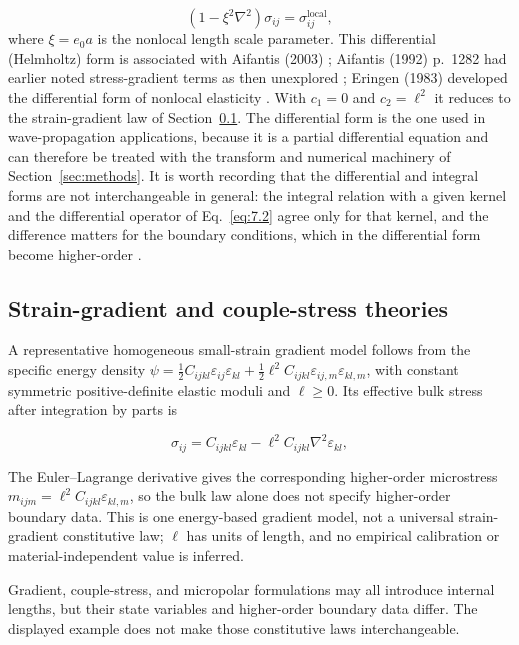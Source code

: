 \begin{equation}
(1 - \xi^2\nabla^2)\sigma_{ij} = \sigma_{ij}^{\mathrm{local}},
\label{eq:7.2}
\end{equation}
where $\xi = e_0 a$ is the nonlocal length scale parameter. This differential (Helmholtz) form is associated with Aifantis (2003) \cite{Aifantis2003}; Aifantis (1992) p.~1282 had earlier noted stress-gradient terms as then unexplored \cite{Aifantis1992}; Eringen (1983) developed the differential form of nonlocal elasticity \cite{Eringen1983}. With $c_1=0$ and $c_2=\ell^2$ it reduces to the strain-gradient law of Section~\ref{sec:7.2}. The differential form is the one used in wave-propagation applications, because it is a partial differential equation and can therefore be treated with the transform and numerical machinery of Section~\ref{sec:methods}. It is worth recording that the differential and integral forms are not interchangeable in general: the integral relation with a given kernel and the differential operator of Eq.~\eqref{eq:7.2} agree only for that kernel, and the difference matters for the boundary conditions, which in the differential form become higher-order \cite{Polizzotto2001}.

\subsection{Strain-gradient and couple-stress theories}
\label{sec:7.2}

A representative homogeneous small-strain gradient model follows from the specific energy density
$\psi=\tfrac12 C_{ijkl}\varepsilon_{ij}\varepsilon_{kl}+\tfrac12\ell^2 C_{ijkl}\varepsilon_{ij,m}\varepsilon_{kl,m}$,
with constant symmetric positive-definite elastic moduli and $\ell\geq0$. Its effective bulk stress after integration by parts is

\begin{equation}
\sigma_{ij} = C_{ijkl}\varepsilon_{kl} - \ell^2 C_{ijkl}\nabla^2\varepsilon_{kl},
\label{eq:7.3}
\end{equation}

The Euler--Lagrange derivative gives the corresponding higher-order microstress $m_{ijm}=\ell^2 C_{ijkl}\varepsilon_{kl,m}$, so the bulk law alone does not specify higher-order boundary data. This is one energy-based gradient model, not a universal strain-gradient constitutive law; $\ell$ has units of length, and no empirical calibration or material-independent value is inferred.

Gradient, couple-stress, and micropolar formulations may all introduce internal lengths, but their state variables and higher-order boundary data differ. The displayed example does not make those constitutive laws interchangeable.


